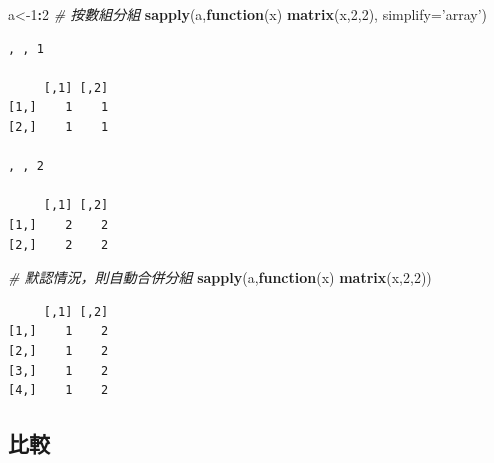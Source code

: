 \documentclass[]{book}
\newenvironment{Shaded}{\begin{snugshade}}{\end{snugshade}}
\newcommand{\CommentTok}[1]{\textcolor[rgb]{0.56,0.35,0.01}{\textit{#1}}}
\newcommand{\ControlFlowTok}[1]{\textcolor[rgb]{0.13,0.29,0.53}{\textbf{#1}}}
\newcommand{\DataTypeTok}[1]{\textcolor[rgb]{0.13,0.29,0.53}{#1}}
\newcommand{\DecValTok}[1]{\textcolor[rgb]{0.00,0.00,0.81}{#1}}
\newcommand{\KeywordTok}[1]{\textcolor[rgb]{0.13,0.29,0.53}{\textbf{#1}}}
\newcommand{\NormalTok}[1]{#1}
\newcommand{\OperatorTok}[1]{\textcolor[rgb]{0.81,0.36,0.00}{\textbf{#1}}}
\newcommand{\StringTok}[1]{\textcolor[rgb]{0.31,0.60,0.02}{#1}}
\theoremstyle{definition}
\theoremstyle{definition}
\theoremstyle{definition}
\theoremstyle{remark}
\begin{document}
\begin{Shaded}
\begin{Highlighting}[]
\NormalTok{a<-}\DecValTok{1}\OperatorTok{:}\DecValTok{2}
\CommentTok{# 按數組分組}
\KeywordTok{sapply}\NormalTok{(a,}\ControlFlowTok{function}\NormalTok{(x) }\KeywordTok{matrix}\NormalTok{(x,}\DecValTok{2}\NormalTok{,}\DecValTok{2}\NormalTok{), }\DataTypeTok{simplify=}\StringTok{'array'}\NormalTok{)}
\end{Highlighting}
\end{Shaded}

\begin{verbatim}
, , 1

     [,1] [,2]
[1,]    1    1
[2,]    1    1

, , 2

     [,1] [,2]
[1,]    2    2
[2,]    2    2
\end{verbatim}

\begin{Shaded}
\begin{Highlighting}[]
\CommentTok{# 默認情況，則自動合併分組}
\KeywordTok{sapply}\NormalTok{(a,}\ControlFlowTok{function}\NormalTok{(x) }\KeywordTok{matrix}\NormalTok{(x,}\DecValTok{2}\NormalTok{,}\DecValTok{2}\NormalTok{))}
\end{Highlighting}
\end{Shaded}

\begin{verbatim}
     [,1] [,2]
[1,]    1    2
[2,]    1    2
[3,]    1    2
[4,]    1    2
\end{verbatim}

\subsection{比較}
\end{document}
